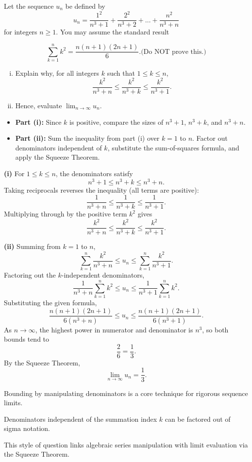 \begin{problem}
Let the sequence $u_n$ be defined by
\[
u_n = \frac{1^2}{n^3 + 1} + \frac{2^2}{n^3 + 2} + \dots + \frac{n^2}{n^3 + n}
\]
for integers $n \ge 1$.
You may assume the standard result 

$$\sum_{k=1}^n k^2 = \frac{n(n+1)(2n+1)}{6}. \text{(Do NOT prove this.)}$$
\begin{enumerate}[(i)]
\item Explain why, for all integers $k$ such that $1 \le k \le n$,
\[
\frac{k^2}{n^3 + n} \le \frac{k^2}{n^3 + k} \le \frac{k^2}{n^3 + 1}.
\]
\item Hence, evaluate $\lim_{n \to \infty} u_n$.
\end{enumerate}
\end{problem}
\begin{hint}
\begin{itemize}[leftmargin=*]
\item \textbf{Part (i):} Since $k$ is positive, compare the sizes of $n^3+1$, $n^3+k$, and $n^3+n$.
\item \textbf{Part (ii):} Sum the inequality from part (i) over $k=1$ to $n$. Factor out denominators independent of $k$, substitute the sum-of-squares formula, and apply the Squeeze Theorem.
\end{itemize}
\end{hint}
\begin{solution}
\textbf{(i)} For $1 \le k \le n$, the denominators satisfy
\[
n^3 + 1 \le n^3 + k \le n^3 + n.
\]
Taking reciprocals reverses the inequality (all terms are positive):
\[
\frac{1}{n^3 + n} \le \frac{1}{n^3 + k} \le \frac{1}{n^3 + 1}.
\]
Multiplying through by the positive term $k^2$ gives
\[
\frac{k^2}{n^3 + n} \le \frac{k^2}{n^3 + k} \le \frac{k^2}{n^3 + 1}.
\]

\textbf{(ii)} Summing from $k=1$ to $n$,
\[
\sum_{k=1}^n \frac{k^2}{n^3 + n} \le u_n \le \sum_{k=1}^n \frac{k^2}{n^3 + 1}.
\]
Factoring out the $k$-independent denominators,
\[
\frac{1}{n^3 + n} \sum_{k=1}^n k^2 \le u_n \le \frac{1}{n^3 + 1} \sum_{k=1}^n k^2.
\]
Substituting the given formula,
\[
\frac{n(n+1)(2n+1)}{6(n^3+n)} \le u_n \le \frac{n(n+1)(2n+1)}{6(n^3+1)}.
\]
As $n \to \infty$, the highest power in numerator and denominator is $n^3$, so both bounds tend to
\[
\frac{2}{6}=\frac{1}{3}.
\]
By the Squeeze Theorem,
\[
\lim_{n \to \infty} u_n = \frac{1}{3}.
\]
\end{solution}
\begin{takeaways}
\item Bounding by manipulating denominators is a core technique for rigorous sequence limits.
\item Denominators independent of the summation index $k$ can be factored out of sigma notation.
\item This style of question links algebraic series manipulation with limit evaluation via the Squeeze Theorem.
\end{takeaways}
